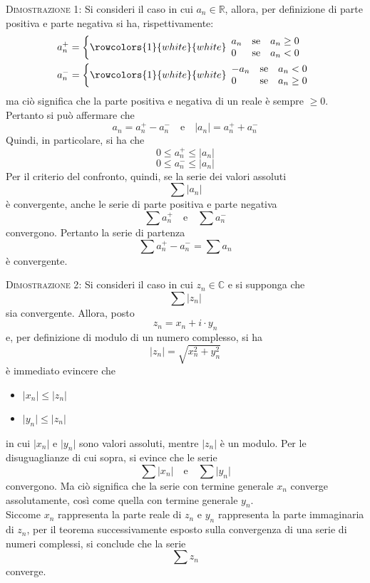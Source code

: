 \documentclass[a4paper]{extarticle}
\begin{document}
\vspace{2em}
\noindent
\normalfont \normalsize
\textsc{Dimostrazione 1}: Si consideri il caso in cui $a_n \in \mathbb{R}$, allora, per definizione di parte positiva e parte negativa si ha, rispettivamente:
\begin{align*}
    &a_n^+ = \left\{
\rowcolors{1}{white}{white}    
\begin{array}{lll}
    a_n & \text{se} & a_n \geq 0\\
    0   & \text{se} & a_n < 0\\
\end{array}
\right.\\
&a_n^- = \left\{
\rowcolors{1}{white}{white}     
\begin{array}{lll}
    -a_n & \text{se} & a_n < 0\\
    0    & \text{se} & a_n \geq 0\\
\end{array}
\right.
\end{align*}
ma ciò significa che la parte positiva e negativa di un reale è sempre $\geq 0$. Pertanto si può affermare che
\[a_n=a_n^+-a_n^- \hspace{1em} \text{e} \hspace{1em} \vert a_n \vert = a_n^++a_n^-\]
Quindi, in particolare, si ha che
\[0 \leq a_n^+ \leq \vert a_n \vert\]
\[0 \leq a_n^- \leq \vert a_n \vert\]
Per il criterio del confronto, quindi, se la serie dei valori assoluti 
\[\sum \left \vert a_n \right \vert\]
è convergente, anche le serie di parte positiva e parte negativa
\[\sum a_n^+ \hspace{1em} \text{e} \hspace{1em} \sum a_n^-\]
convergono. Pertanto la serie di partenza
\[\sum a_n^+-a_n^- = \sum a_n\]
è convergente.

\vspace{2em}
\noindent
\normalfont \normalsize
\textsc{Dimostrazione 2}: Si consideri il caso in cui $z_n \in \mathbb{C}$ e si supponga che 
\[\sum \left \vert z_n \right \vert\]
sia convergente. Allora, posto
\[z_n = x_n + i \cdot y_n\]
e, per definizione di modulo di un numero complesso, si ha
\[\left \vert z_n \right \vert = \sqrt{x_n^2+y_n^2}\]
è immediato evincere che
\begin{itemize}
    \item $\vert x_n \vert \leq \vert z_n \vert$
    \item $\vert y_n \vert \leq \vert z_n \vert$
\end{itemize}
in cui $\vert x_n \vert$ e $\vert y_n \vert$ sono valori assoluti, mentre $\vert z_n \vert$ è un modulo. Per le disuguaglianze di cui sopra, si evince che le serie
\[\sum \vert x_n \vert \hspace{1em} \text{e} \hspace{1em} \sum \vert y_n \vert\]
convergono. Ma ciò significa che la serie con termine generale $x_n$ converge assolutamente, così come quella con termine generale $y_n$.\\
Siccome $x_n$ rappresenta la parte reale di $z_n$ e $y_n$ rappresenta la parte immaginaria di $z_n$, per il teorema successivamente esposto sulla convergenza di una serie di numeri complessi, si conclude che la serie
\[\sum z_n\]
converge.
\end{document}
